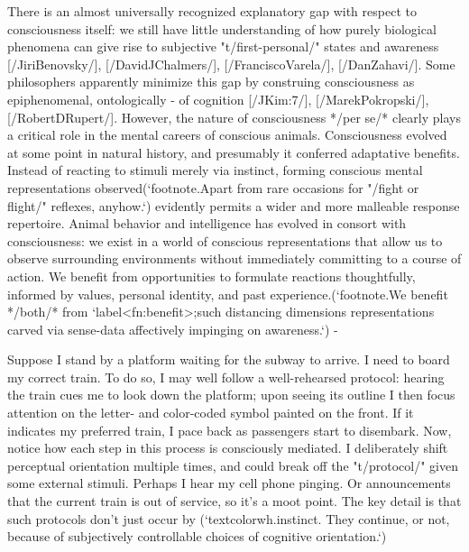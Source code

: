 There is an almost universally recognized explanatory gap with respect 
to consciousness itself: we still have little understanding of 
how purely biological phenomena can give rise to subjective 
"t/first-personal/" states and awareness [/JiriBenovsky/], [/DavidJChalmers/],
[/FranciscoVarela/], [/DanZahavi/].  Some philosophers 
apparently minimize this gap by construing consciousness as epiphenomenal, 
ontologically -%
of cognition [/JKim:7/], [/MarekPokropski/], 
[/RobertDRupert/].  However, the 
nature of consciousness */per se/* clearly 
plays a critical role in the mental careers of conscious animals.  
Consciousness evolved at some point in natural history, and presumably 
it conferred adaptative benefits.  Instead of reacting to stimuli 
merely via instinct, forming conscious mental representations  
observed(`footnote.Apart from rare occasions for   
"/fight or flight/" reflexes, anyhow.`) %
evidently permits a wider and more malleable response 
repertoire.  Animal behavior and intelligence 
has evolved in consort with consciousness: we exist in a world 
of conscious representations that allow us to observe 
surrounding environments without immediately committing to a 
course of action.  We benefit 
from opportunities to formulate reactions thoughtfully, informed 
by values, personal identity, and past experience.(`footnote.We benefit 
*/both/* from `label<fn:benefit>;such 
distancing %
dimensions %
representations carved via sense-data affectively 
impinging on awareness.`) -%

Suppose I stand by a platform waiting for the subway to arrive.  I need to board 
my correct train.  To do so, I may well follow a well-rehearsed 
protocol: hearing the train cues me to look down the platform; upon seeing 
its outline I then focus attention on the letter- and color-coded 
symbol painted on the front.  If it indicates my preferred train, 
I pace back as passengers start to disembark.  Now, notice how each step in this process is consciously mediated. 
I deliberately shift perceptual orientation multiple 
times, and could break off the "t/protocol/" given some external 
stimuli.  Perhaps I hear my cell phone pinging.  Or announcements 
that the current train is out of service, so it's a moot point.  The key 
detail is that such protocols don't just occur by
(`textcolorwh.instinct.  They continue,
or not, because of subjectively controllable choices of cognitive orientation.`)

